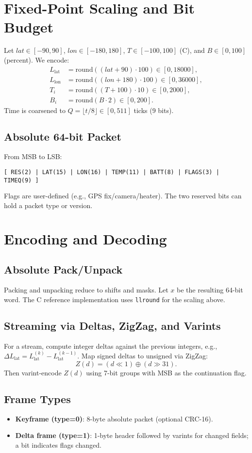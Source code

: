 \documentclass[conference]{IEEEtran}
\begin{document}
\section{Fixed-Point Scaling and Bit Budget}
Let $lat \in [-90,90]$, $lon \in [-180,180]$, $T \in [-100,100]$ (C), and $B \in [0,100]$ (percent). We encode:
\begin{align}
L_{\text{lat}} &= \mathrm{round}((lat+90)\cdot100) \in [0, 18000], \\
L_{\text{lon}} &= \mathrm{round}((lon+180)\cdot100) \in [0, 36000], \\
T_i &= \mathrm{round}((T+100)\cdot10) \in [0, 2000], \\
B_i &= \mathrm{round}(B\cdot2) \in [0, 200].
\end{align}
Time is coarsened to $Q=\lfloor t/8 \rfloor \in [0,511]$ ticks (9 bits).
\subsection{Absolute 64-bit Packet}
From MSB to LSB:
\begin{lstlisting}
[ RES(2) | LAT(15) | LON(16) | TEMP(11) | BATT(8) | FLAGS(3) | TIMEQ(9) ]
\end{lstlisting}
Flags are user-defined (e.g., GPS fix/camera/heater). The two reserved bits can hold a packet type or version.
\section{Encoding and Decoding}
\subsection{Absolute Pack/Unpack}
Packing and unpacking reduce to shifts and masks. Let $x$ be the resulting 64-bit word. The C reference implementation uses \texttt{llround} for the scaling above.
\subsection{Streaming via Deltas, ZigZag, and Varints}
For a stream, compute integer deltas against the previous integers, e.g., $\Delta L_{\text{lat}}=L_{\text{lat}}^{(k)}-L_{\text{lat}}^{(k-1)}$. Map signed deltas to unsigned via ZigZag:
\begin{equation}
Z(d) = (d \ll 1) \oplus (d \gg 31).
\end{equation}
Then varint-encode $Z(d)$ using 7-bit groups with MSB as the continuation flag.
\subsection{Frame Types}
\begin{itemize}
\item \textbf{Keyframe (type=0)}: 8-byte absolute packet (optional CRC-16).
\item \textbf{Delta frame (type=1)}: 1-byte header followed by varints for changed fields; a bit indicates flags changed.
\end{itemize}
\end{document}
